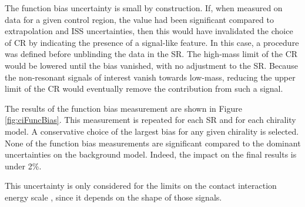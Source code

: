 The function bias uncertainty is small by construction.
If, when measured on data for a given control region, the value had been significant compared to extrapolation and ISS uncertainties, then this would have invalidated the choice of CR by indicating the presence of a signal-like feature.
In this case, a procedure was defined before unblinding the data in the SR.
The high-mass limit of the CR would be lowered until the bias vanished, with no adjustment to the SR. 
Because the non-resonant signals of interest vanish towards low-mass, reducing the upper limit of the CR would eventually remove the contribution from such a signal.

The results of the function bias measurement are shown in Figure \ref{fig:ciFuncBias}.
This measurement is repeated for each SR and for each chirality model.
A conservative choice of the largest bias for any given chirality is selected.
None of the function bias measurements are significant compared to the dominant uncertainties on the background model.
Indeed, the impact on the final results is under 2\%.

This uncertainty is only considered for the limits on the contact interaction energy scale \lam, since it depends on the shape of those signals.

